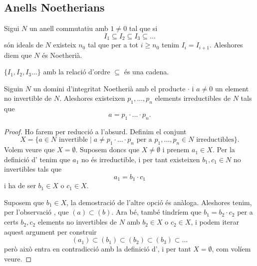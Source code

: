 \documentclass[../../Main.tex]{subfiles}
\begin{document}
	\subsection{Anells Noetherians}
	\begin{definition}
		\label{def:anell Noetherià}
		Sigui \(N\) un anell commutatiu amb \(1\neq0\) tal que si
		\[I_{1}\subseteq I_{2}\subseteq I_{3}\subseteq\dots\]
		són ideals de \(N\) existeix \(n_{0}\) tal que per a tot \(i\geq n_{0}\) tenim \(I_{i}=I_{i+1}\). Aleshores diem que \(N\) és Noetherià.
	\end{definition}
	\begin{observation}
		\(\{I_{1},I_{2},I_{3}\dots\}\) amb la relació d'ordre \(\subseteq\) és una cadena.
	\end{observation}
	\begin{lemma}
		\label{lema:DIP és DFU}
		Siguin \(N\) un domini d'integritat Noetherià amb el producte \(\cdot\) i \(a\neq0\) un element no invertible de \(N\). Aleshores existeixen \(p_{1},\dots,p_{n}\) elements irreductibles de \(N\) tals que
		\[a=p_{1}\cdot\ldots\cdot p_{n}.\]
		\begin{proof}
			Ho farem per reducció a l'absurd. Definim el conjunt
			\[X=\{a\in N\text{ invertible}\mid a\neq p_{1}\cdot\ldots\cdot p_{n}\text{ per a }p_{1},\dots,p_{n}\in N\text{ irreductibles}\}.\]
			Volem veure que \(X=\emptyset\). Suposem doncs que \(X\neq\emptyset\) i prenem \(a_{1}\in X\). Per la definició d' tenim que \(a_{1}\) no és irreductible, i per tant existeixen \(b_{1},c_{1}\in N\) no invertibles tals que
			\[a_{1}=b_{1}\cdot c_{1}\]
			i ha de ser \(b_{1}\in X\) o \(c_{1}\in X\).
			
			Suposem que \(b_{1}\in X\), la demostració de l'altre opció és anàloga. Aleshores tenim, per l'observació , que \((a)\subset(b)\). Ara bé, també tindríem que \(b_{1}=b_{2}\cdot c_{2}\) per a certs \(b_{2},c_{2}\) elements no invertibles de \(N\) amb \(b_{2}\in X\) o \(c_{2}\in X\), i podem iterar aquest argument per construir
			\[(a_{1})\subset(b_{1})\subset(b_{2})\subset(b_{3})\subset\dots\]
			però això entra en contradicció amb la definició d', i per tant \(X=\emptyset\), com volíem veure.
		\end{proof}
	\end{lemma}
\end{document}
